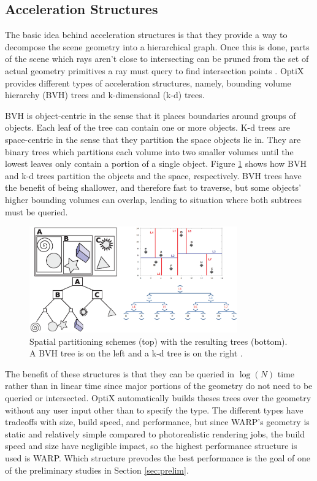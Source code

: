 \subsection{Acceleration Structures}

The basic idea behind acceleration structures is that they provide a way to decompose the scene geometry into a hierarchical graph.  Once this is done, parts of the scene which rays aren't close to intersecting can be pruned from the set of actual geometry primitives a ray must query to find intersection points \cite{optix}.  OptiX provides different types of acceleration structures, namely, bounding volume hierarchy (BVH) trees and k-dimensional (k-d) trees.

BVH is object-centric in the sense that it places boundaries around groups of objects.  Each leaf of the tree can contain one or more objects. K-d trees are space-centric in the sense that they partition the space objects lie in.  They are binary trees which partitions each volume into two smaller volumes until the lowest leaves only contain a portion of a single object.  Figure \ref{bvh_kd} shows how BVH and k-d trees partition the objects and the space, respectively.  BVH trees have the benefit of being shallower, and therefore fast to traverse, but some objects' higher bounding volumes can overlap, leading to situation where both subtrees must be queried.

\begin{figure}[h!] 
\centering
\includegraphics[width=0.8\textwidth, trim= 8cm 0cm 0cm 0cm ]{graphics/bvh_kd.eps}
\caption[Spatial partitioning schemes with the resulting trees.]{Spatial partitioning schemes (top) with the resulting trees (bottom). A BVH tree \cite{wikimedia_bvh} is on the left and a k-d tree is on the right \cite{wikimedia_kd}.   \label{bvh_kd}}
\end{figure}

The benefit of these structures is that they can be queried in $\log(N)$ time rather than in linear time since major portions of the geometry do not need to be queried or intersected.  OptiX automatically builds theses trees over the geometry without any user input other than to specify the type.  The different types have tradeoffs with size, build speed, and performance, but since WARP's geometry is static and relatively simple compared to photorealistic rendering jobs, the build speed and size have negligible impact, so the highest performance structure is used is WARP.  Which structure prevodes the best performance is the goal of one of the preliminary studies in Section \ref{sec:prelim}.  

